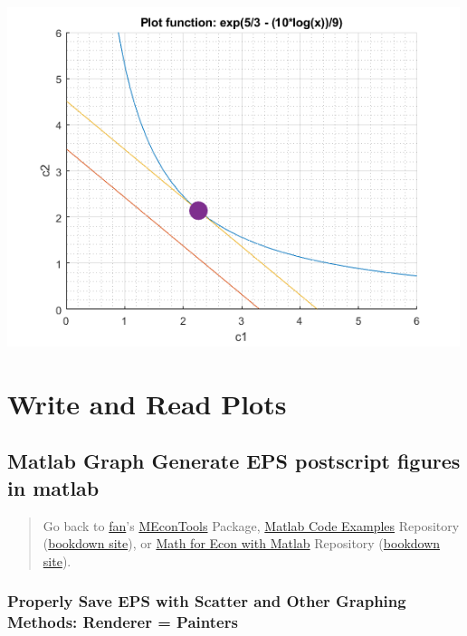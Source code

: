 \documentclass[
]{book}
\begin{document}
\includegraphics[width=5.20833in,height=\textheight]{img/fs_fplot_images/figure_3.png}

\hypertarget{write-and-read-plots}{%
\section{Write and Read Plots}\label{write-and-read-plots}}

\hypertarget{matlab-graph-generate-eps-postscript-figures-in-matlab}{%
\subsection{Matlab Graph Generate EPS postscript figures in matlab}\label{matlab-graph-generate-eps-postscript-figures-in-matlab}}

\begin{quote}
Go back to \href{http://fanwangecon.github.io/}{fan}'s \href{https://fanwangecon.github.io/MEconTools/}{MEconTools} Package, \href{https://fanwangecon.github.io/M4Econ/}{Matlab Code Examples} Repository (\href{https://fanwangecon.github.io/M4Econ/bookdown}{bookdown site}), or \href{https://fanwangecon.github.io/Math4Econ/}{Math for Econ with Matlab} Repository (\href{https://fanwangecon.github.io/Math4Econ/bookdown}{bookdown site}).
\end{quote}

\hypertarget{properly-save-eps-with-scatter-and-other-graphing-methods-renderer-painters}{%
\subsubsection{Properly Save EPS with Scatter and Other Graphing Methods: Renderer = Painters}\label{properly-save-eps-with-scatter-and-other-graphing-methods-renderer-painters}}
\end{document}
